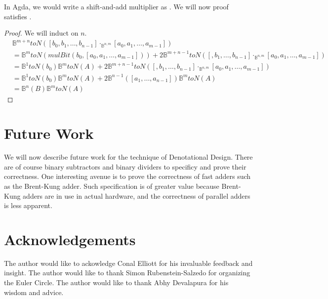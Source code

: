 \documentclass[14pt]{extarticle}  %
\newcommand{\atticus}[1]{\textbf{AK: #1}}
\begin{document}
In Agda, we would write a shift-and-add multiplier as . We will now proof  satisfies .
\begin{proof}
  We will induct on $n$.
  \begin{align*}
   & \mathbb{B}^{m+n}toN([b_{0},b_{1},\ldots,b_{n-1}] \cdot_{\mathbb{B}^{n,m}} [a_{0}, a_{1}, \ldots, a_{m-1}]  ) \\
    &=\mathbb{B}^{m}toN(mulBit(b_{0}, [a_{0}, a_{1}, \ldots,a_{m-1}])) + 2\mathbb{B}^{m+n-1}toN([,b_{1},\ldots,b_{n-1}] \cdot_{\mathbb{B}^{n,m}} [a_{0}, a_{1}, \ldots, a_{m-1}]  ) \\
    &=\mathbb{B}^{1}toN(b_{0})\mathbb{B}^{m}toN(A) + 2\mathbb{B}^{m+n-1}toN([,b_{1},\ldots,b_{n-1}] \cdot_{\mathbb{B}^{n,m}} [a_{0}, a_{1}, \ldots, a_{m-1}]  ) \\
    &=\mathbb{B}^{1}toN(b_{0})\mathbb{B}^{m}toN(A) + 2\mathbb{B}^{n-1}([a_{1}, \ldots, a_{n-1}])\mathbb{B}^{m}toN(A) \\
    &=\mathbb{B}^{n}(B)\mathbb{B}^{m}toN(A)
\end{align*}
\end{proof}




\section{Future Work}
We will now describe future work for the technique of Denotational Design. There are of course binary subtractors and binary dividers
to specificy and prove their correctness. One interesting avenue is to prove the correctness of fast adders such as the Brent-Kung adder.
Such specification is of greater value because Brent-Kung adders are in use in actual hardware, and the correctness of parallel adders is less apparent.

\section*{Acknowledgements}
The author would like to ackowledge Conal Elliott for his invaluable feedback and insight. The author would like to thank Simon Rubenstein-Salzedo for organizing the Euler Circle.
The author would like to thank Abhy Devalapura for his wisdom and advice.


\end{document}
